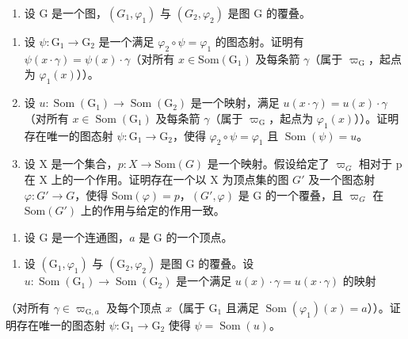 \begin{enumerate}
\def\labelenumi{\arabic{enumi})}
\setcounter{enumi}{6}
\tightlist
\item
  设 G 是一个图，\((G_{1},\varphi_{1})\) 与 \((G_{2},\varphi_{2})\) 是图 G 的覆叠。
\end{enumerate}

\begin{enumerate}
\def\labelenumi{\alph{enumi})}
\item
  设 \(\psi\colon\mathrm{G}_{1}\to\mathrm{G}_{2}\) 是一个满足 \(\varphi_{2}\circ\psi=\varphi_{1}\) 的图态射。证明有 \(\psi(x\cdot\gamma)=\psi(x)\cdot\gamma\)（对所有 \(x\in\mathrm{Som}(\mathrm{G}_{1})\) 及每条箭 \(\gamma\)（属于 \(\varpi_{\mathrm{G}}\)，起点为 \(\varphi_{1}(x)\)））。
\item
  设 \(u \colon \operatorname{Som}(\mathrm{G}_1) \to \operatorname{Som}(\mathrm{G}_2)\) 是一个映射，满足 \(u(x \cdot \gamma) = u(x) \cdot \gamma\)（对所有 \(x \in \operatorname{Som}(\mathrm{G}_1)\) 及每条箭 \(\gamma\)（属于 \(\varpi_{\mathrm{G}}\)，起点为 \(\varphi_1(x)\)））。证明存在唯一的图态射 \(\psi \colon \mathrm{G}_1 \to \mathrm{G}_2\)，使得 \(\varphi_2 \circ \psi = \varphi_1\) 且 \(\operatorname{Som}(\psi) = u\)。
\item
  设 X 是一个集合，\(p: X \to \text{Som}(G)\) 是一个映射。假设给定了 \(\varpi_{G}\) 相对于 p 在 X 上的一个作用。证明存在一个以 X 为顶点集的图 \(G'\) 及一个图态射 \(\varphi: G' \to G\)，使得 \(\text{Som}(\varphi) = p\)，\((G', \varphi)\) 是 G 的一个覆叠，且 \(\varpi_{G}\) 在 \(\text{Som}(G')\) 上的作用与给定的作用一致。
\end{enumerate}

\begin{enumerate}
\def\labelenumi{\arabic{enumi})}
\setcounter{enumi}{7}
\tightlist
\item
  设 G 是一个连通图，\(a\) 是 G 的一个顶点。
\end{enumerate}

\begin{enumerate}
\def\labelenumi{\alph{enumi})}
\tightlist
\item
  设 \((\mathrm{G}_{1},\varphi_{1})\) 与 \((\mathrm{G}_{2},\varphi_{2})\) 是图 G 的覆叠。设 \(u\colon\operatorname{Som}(\mathrm{G}_{1})\to\operatorname{Som}(\mathrm{G}_{2})\) 是一个满足 \(u(x)\cdot\gamma=u(x\cdot\gamma)\) 的映射
\end{enumerate}

（对所有 \(\gamma \in \varpi_{\mathrm{G},a}\) 及每个顶点 \(x\)（属于 \(\mathrm{G}_1\) 且满足 \(\operatorname{Som}(\varphi_1)(x) = a\)））。证明存在唯一的图态射 \(\psi: \mathrm{G}_1 \to \mathrm{G}_2\) 使得 \(\psi = \operatorname{Som}(u)\)。

